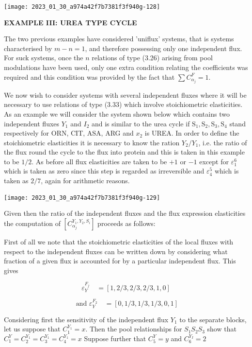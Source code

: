 \begin{center}
\texttt{[image: 2023\_01\_30\_a974a42f7b7381f3f940g-128]}
\end{center}

{\bf\large EXAMPLE III: UREA TYPE CYCLE}

The two previous examples have considered 'uniflux' systems, that is systems characterised by $m-n=1$, and therefore possessing only one independent flux. For suck systems, once the $n$ relations of type (3.26) arising from pool modulations have been used, only one extra condition relating the coefficients was required and this condition was provided by the fact that $\sum C_{\alpha_{j}}^{F}=1$.

We now wish to consider systems with several independent fluxes where it will be necessary to use relations of type (3.33) which involve stoichiometric elasticities. As an example we will consider the system shown below which contains two independent fluxes $Y_{1}$ and $I_{2}$ and is similar to the urea cycle if $\mathrm{S}_{1}, \mathrm{S}_{2}, \mathrm{S}_{3}, \mathrm{S}_{4}$ stand respectively for ORN, CIT, ASA, ARG and $x_{2}$ is UREA. In order to define the stoichiometric elasticities it is necessary to know the ration $Y_{2} / Y_{1}$, i.e. the ratio of the flux round the cycle to the flux into protein and this is taken in this example to be $1 / 2$. As before all flux elasticities are taken to be $+1$ or $-1$ except for $\varepsilon_{1}^{6}$ which is taken as zero since this step is regarded as irreversible and $\varepsilon_{4}^{5}$ which is taken as $2 / 7$, again for arithmetic reasons.

\begin{center}
\texttt{[image: 2023\_01\_30\_a974a42f7b7381f3f940g-129]}
\end{center}

Given then the ratio of the independent fluxes and the flux expression elasticities the computation of $\left[C^{Y_1,Y_2,S_i}_{\alpha_j}\right]$ proceeds as follows:

First of all we note that the stoichiometric elasticities of the local fluxes with respect to the independent fluxes can be written down by considering what fraction of a given flux is accounted for by a particular independent flux. This gives

$$ \varepsilon_{Y}^{F_j} \quad = [1, 2/3, 2/3, 2/3, 1, 0] $$

$$\mbox{ and } \varepsilon_{Y}^{F_2} \quad = [0, 1/3, 1/3, 1/3, 0, 1] $$

Considering first the sensitivity of the independent flux $Y_{1}$ to the separate blocks, let us suppose that $C^{Y_1}_1 = x$. Then the pool relationships for $S_{1} S_{2} S_{3}$ show that $C_{1}^{Y}=C_{2}^{Y_{1}}=C_{3}^{Y_{1}}=C_{4}^{Y_{1}}=x$ Suppose further that $C_{5}^{Y}=y$ and $C_{6}^{Y_{I}}
=2$

